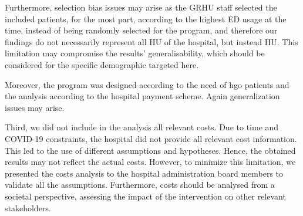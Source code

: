 \documentclass{bmcart}
\begin{document}
\par Furthermore, selection bias issues may arise as the  GRHU staff selected the included patients,  for the most part,  according to the highest ED usage at the time, instead of being randomly selected for the program, and therefore our findings do not necessarily represent all HU of the hospital, but instead HU.
This limitation may compromise the results' generalisability, which should be considered for the specific demographic targeted here.
\par Moreover, the program was designed according to the need of \gls{hgo} patients and the analysis according to the hospital payment scheme. 
Again generalization issues may arise. 
\par Third, we did not include in the analysis all relevant costs. Due to time and COVID-19 constraints, the hospital did not provide all relevant cost information. 
This led to the use of different assumptions and hypotheses. 
Hence, the obtained results may not reflect the actual costs. 
However, to minimize this limitation, we presented the costs analysis to the hospital administration board members to validate all the assumptions. 
Furthermore, costs should be analysed from a societal perspective, assessing the impact of the intervention on other relevant stakeholders. 
\end{document}
